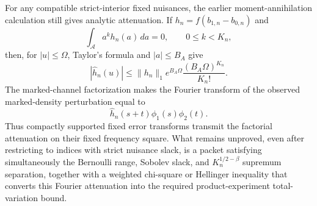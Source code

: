 For any compatible strict-interior fixed nuisances, the earlier moment-annihilation calculation still gives analytic attenuation.  If \(h_n=f(b_{1,n}-b_{0,n})\) and
\[
 \int_{\mathcal A}a^kh_n(a)\,da=0,
 \qquad 0\le k<K_n,
\]
then, for \(|u|\le\Omega\), Taylor's formula and \(|a|\le B_A\) give
\[
 |\widehat h_n(u)|
 \le\|h_n\|_1e^{B_A\Omega}
       \frac{(B_A\Omega)^{K_n}}{K_n!}.
\]
The marked-channel factorization makes the Fourier transform of the observed marked-density perturbation equal to
\[
 \widehat h_n(s+t)\phi_1(s)\phi_2(t).
\]
Thus compactly supported fixed error transforms transmit the factorial attenuation on their fixed frequency square.  What remains unproved, even after restricting to indices with strict nuisance slack, is a packet satisfying simultaneously the Bernoulli range, Sobolev slack, and \(K_n^{1/2-\beta}\) supremum separation, together with a weighted chi-square or Hellinger inequality that converts this Fourier attenuation into the required product-experiment total-variation bound.
